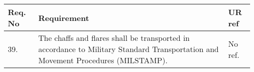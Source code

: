 \begin{center}
    \begin{tabular}{ | l | p{9cm} | l |}
    \hline
    Req. No & Requirement  & UR ref \\ \hline
    39. & The chaffs and flares shall be transported in accordance to Military Standard Transportation and Movement Procedures (MILSTAMP). & No ref.\\ \hline
    \end{tabular}
\end{center}
